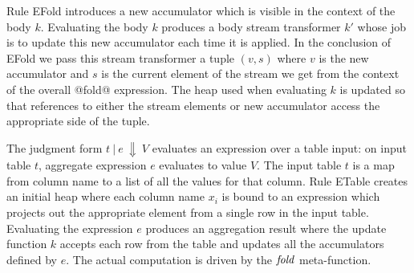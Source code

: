 Rule EFold introduces a new accumulator which is visible in the context of the body $k$. Evaluating the body $k$ produces a body stream transformer $k'$ whose job is to update this new accumulator each time it is applied. In the conclusion of EFold we pass this stream transformer a tuple $(v, s)$ where $v$ is the new accumulator and $s$ is the current element of the stream we get from the context of the overall @fold@ expression. The heap used when evaluating $k$ is updated so that references to either the stream elements or new accumulator access the appropriate side of the tuple.

The judgment form $t~|~e~\Downarrow~V$ evaluates an expression over a table input: on input table $t$, aggregate expression $e$ evaluates to value $V$.
The input table $t$ is a map from column name to a list of all the values for that column.
Rule ETable creates an initial heap where each column name $x_i$ is bound to an expression which projects out the appropriate element from a single row in the input table. Evaluating the expression $e$ produces an aggregation result where the update function $k$ accepts each row from the table and updates all the accumulators defined by $e$. The actual computation is driven by the $\mathit{fold}$ meta-function.


